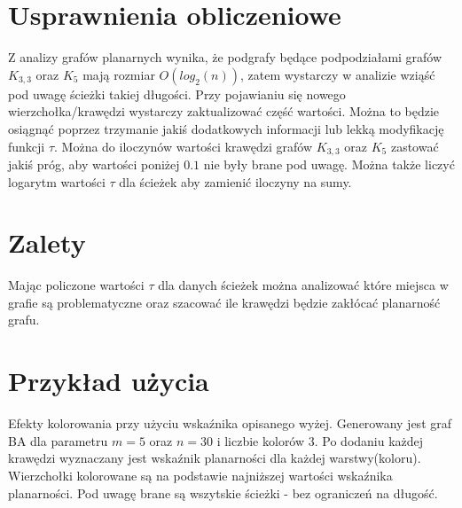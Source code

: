 \documentclass{article}
\begin{document}
\section{Usprawnienia obliczeniowe}
Z analizy grafów planarnych wynika, że podgrafy będące podpodziałami grafów $K_{3,3}$ oraz $K_5$ mają rozmiar $O(log_2(n))$, zatem wystarczy w analizie wziąść pod uwagę ścieżki takiej długości.
\newline
Przy pojawianiu się nowego wierzchołka/krawędzi wystarczy zaktualizować część wartości. Można to będzie osiągnąć poprzez trzymanie jakiś dodatkowych informacji lub lekką modyfikację funkcji $\tau$.
Można do iloczynów wartości krawędzi grafów $K_{3,3}$ oraz $K_5$ zastować jakiś próg, aby wartości poniżej $0.1$ nie były brane pod uwagę. Można także liczyć logarytm wartości $\tau$ dla ścieżek aby zamienić iloczyny na sumy.

\section{Zalety}
Mając policzone wartości $\tau$ dla danych ścieżek można analizować które miejsca w grafie są problematyczne oraz szacować ile krawędzi będzie zakłócać planarność grafu.

\section{Przykład użycia}
Efekty kolorowania przy użyciu wskaźnika opisanego wyżej. Generowany jest graf BA dla parametru $m=5$ oraz $n=30$ i liczbie kolorów 3. 
Po dodaniu każdej krawędzi wyznaczany jest wskaźnik planarności dla każdej warstwy(koloru). Wierzchołki kolorowane są na podstawie najniższej wartości wskaźnika planarności.
Pod uwagę brane są wszytskie ścieżki - bez ograniczeń na długość.
\end{document}
